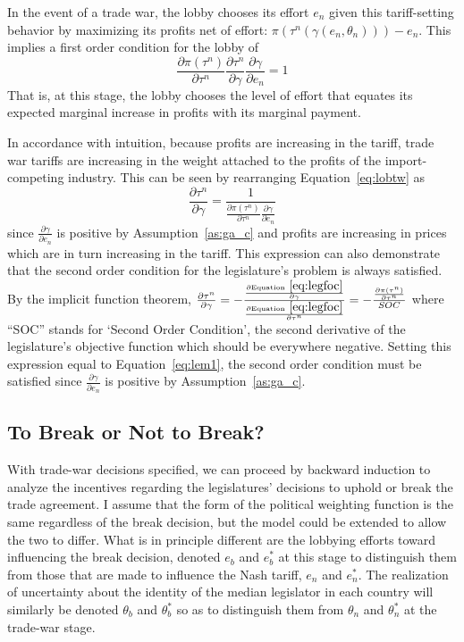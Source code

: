 \documentclass[10pt]{article}
\newcommand{\ve}{\theta}
\newcommand{\ga}{\gamma}
\begin{document}
In the event of a trade war, the lobby chooses its effort $e_n$ given this tariff-setting behavior by maximizing its profits net of effort: $\pi\left(\tau^n\left(\ga\left(e_n,\ve_n\right)\right)\right) - e_n$. This implies a first order condition for the lobby of
\begin{equation}
	\frac{\partial \pi(\tau^n)}{\partial \tau^n}\frac{\partial \tau^n}{\partial \ga} \frac{\partial \ga}{\partial e_n} = 1
  \label{eq:lobtw}
\end{equation}
That is, at this stage, the lobby chooses the level of effort that equates its expected marginal increase in profits with its marginal payment.

In accordance with intuition, because profits are increasing in the tariff, trade war tariffs are increasing in the weight attached to the profits of the import-competing industry. This can be seen by rearranging Equation~\ref{eq:lobtw} as 
\begin{equation}
  \frac{\partial \tau^n}{\partial \ga} = \frac{1}{\frac{\partial \pi(\tau^n)}{\partial \tau^n} \frac{\partial \ga}{\partial e_n}}
	\label{eq:lem1}
\end{equation}
since $\frac{\partial \ga}{\partial e_n}$ is positive by Assumption~\ref{as:ga_c} and profits are increasing in prices which are in turn increasing in the tariff. This expression can also demonstrate that the second order condition for the legislature's problem is always satisfied. By the implicit function theorem, $\frac{\partial \tau^n}{\partial \ga} = -\frac{\frac{\partial \text{Equation}~\ref{eq:legfoc}}{\partial \ga}}{\frac{\partial \text{Equation}~\ref{eq:legfoc}}{\partial \tau^n}} = -\frac{\frac{\partial \pi(\tau^n)}{\partial \tau^n}}{SOC}$ where ``SOC'' stands for `Second Order Condition', the second derivative of the legislature's objective function which should be everywhere negative. Setting this expression equal to Equation~\ref{eq:lem1}, the second order condition must be satisfied since $\frac{\partial \ga}{\partial e_n}$ is positive by Assumption~\ref{as:ga_c}.


\bigskip
\subsection{To Break or Not to Break?}
\label{sec:break}
With trade-war decisions specified, we can proceed by backward induction to analyze the incentives regarding the legislatures' decisions to uphold or break the trade agreement. I assume that the form of the political weighting function is the same regardless of the break decision, but the model could be extended to allow the two to differ. What is in principle different are the lobbying efforts toward influencing the break decision, denoted $e_b$ and $e_b^*$ at this stage to distinguish them from those that are made to influence the Nash tariff, $e_n$ and $e_n^*$. The realization of uncertainty about the identity of the median legislator in each country will similarly be denoted $\ve_b$ and $\ve_b^*$ so as to distinguish them from $\ve_n$ and $\ve_n^*$ at the trade-war stage. 
\end{document}
